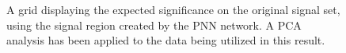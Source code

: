 \begin{figure}[H]
    \caption{A grid displaying the expected significance on the original signal set, using the signal region 
    created by the \acs{PNN} network. A \acs{PCA} analysis has been applied to the data being utilized in this result.}
    \label{fig:PNNPCAGridSig}
\end{figure}

